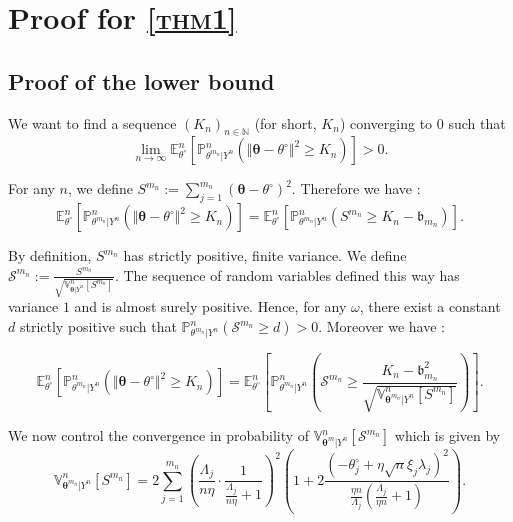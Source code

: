 \section{Proof for \textsc{\cref{thm1}}}
\subsection{Proof of the lower bound}

We want to find a sequence $\left(K_{n}\right)_{n \in \mathds{N}}$ (for short, $K_{n}$) converging to $0$ such that
\[\lim\limits_{n \rightarrow \infty} \mathds{E}_{\theta^{\circ}}^{n}\left[\mathds{P}_{\theta^{m_{n}}\vert Y^{n}}^{n}\left(\Vert \boldsymbol{\theta} - \theta^{\circ} \Vert^{2} \geq K_{n}\right)\right] > 0.\]

For any $n$, we define $S^{m_{n}} := \sum_{j=1}^{m_{n}} \left(\boldsymbol{\theta} - \theta^{\circ}\right)^{2}$. Therefore we have : 
\[\mathds{E}_{\theta^{\circ}}^{n}\left[\mathds{P}_{\theta^{m_{n}}\vert Y^{n}}^{n}\left(\Vert \boldsymbol{\theta} - \theta^{\circ} \Vert^{2} \geq K_{n}\right)\right] = \mathds{E}_{\theta^{\circ}}^{n}\left[\mathds{P}_{\theta^{m_{n}}\vert Y^{n}}^{n}\left(S^{m_{n}} \geq K_{n} - \mathfrak{b}_{m_{n}}\right)\right].\]

By definition, $S^{m_{n}}$ has strictly positive, finite variance. We define $\mathcal{S}^{m_{n}} := \frac{S^{m_{n}}}{\sqrt{\mathds{V}_{\boldsymbol{\theta}\vert Y^{n}}^{n}[S^{m_{n}}]}}.$
The sequence of random variables defined this way has variance $1$ and is almost surely positive.
Hence, for any $\omega$, there exist a constant $d$ strictly positive such that $\mathds{P}_{\theta^{m_{n}}\vert Y^{n}}^{n}\left(\mathcal{S}^{m_{n}} \geq d\right)>0$.
Moreover we have :

\[\mathds{E}_{\theta^{\circ}}^{n}\left[\mathds{P}_{\theta^{m_{n}}\vert Y^{n}}^{n}\left(\Vert \boldsymbol{\theta} - \theta^{\circ} \Vert^{2} \geq K_{n}\right)\right] = \mathds{E}_{\theta^{\circ}}^{n}\left[\mathds{P}_{\theta^{m_{n}}\vert Y^{n}}^{n}\left(\mathcal{S}^{m_{n}} \geq \frac{K_{n} - \mathfrak{b}_{m_{n}}^{2}}{\sqrt{\mathds{V}_{\boldsymbol{\theta}^{m_{n}} \vert Y^{n}}^{n}\left[S^{m_{n}}\right]}}\right)\right].\]

We now control the convergence in probability of $\mathds{V}_{\boldsymbol{\theta}^{m} \vert Y^{n}}^{n}\left[\mathcal{S}^{m_{n}}\right]$ which is given by
\[\mathds{V}_{\boldsymbol{\theta}^{m_{n}} \vert Y^{n}}^{n}\left[S^{m_{n}}\right] = 2 \sum\limits_{j = 1}^{m_{n}} \left(\frac{\Lambda_{j}}{n \eta}\cdot \frac{1}{\frac{\Lambda_{j}}{n \eta} + 1}\right)^{2}\left(1 + 2 \frac{\left(- \theta^{\circ}_{j} + \eta \sqrt{n} \xi_{j} \lambda_{j}\right)^{2}}{\frac{\eta n}{\Lambda_{j}}\left(\frac{\Lambda_{j}}{\eta n} + 1\right)}\right).\]

